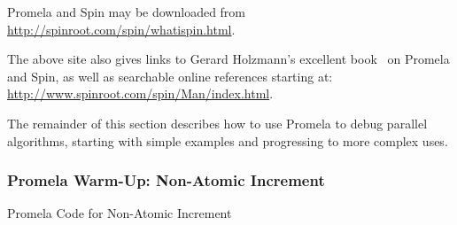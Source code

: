 Promela and Spin may be downloaded from
\url{http://spinroot.com/spin/whatispin.html}.

The above site also gives links to Gerard Holzmann's excellent
book~\cite{Holzmann03a} on Promela and Spin,
as well as searchable online references starting at:
\url{http://www.spinroot.com/spin/Man/index.html}.

The remainder of this section describes how to use Promela to debug
parallel algorithms, starting with simple examples and progressing to
more complex uses.

\subsubsection{Promela Warm-Up: Non-Atomic Increment}
\label{sec:formal:Promela Warm-Up: Non-Atomic Increment}
\NoIndentAfterThis

\begin{listing}[tbp]

\caption{Promela Code for Non-Atomic Increment}
\label{lst:formal:Promela Code for Non-Atomic Increment}
\end{listing}

